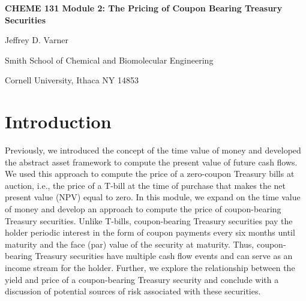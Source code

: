 \documentclass[11pt]{article}
\theoremstyle{definition}
\begin{document}
{\par\centering\textbf{\Large CHEME 131 Module 2: The Pricing of Coupon Bearing Treasury Securities}}
\vspace{0.2in}
{\par \centering \large{Jeffrey D. Varner}}
\vspace{0.05in}
{\par \centering \large{Smith School of Chemical and Biomolecular Engineering}}
{\par \centering \large{Cornell University, Ithaca NY 14853}}

\date{}
\thispagestyle{empty}

\setcounter{page}{1}

\section*{Introduction}
Previously, we introduced the concept of the time value of money and developed the abstract asset framework to compute the present value of future cash flows.
We used this approach to compute the price of a zero-coupon Treasury bills at auction, 
i.e., the price of a T-bill at the time of purchase that makes the net present value (NPV) equal to zero.
In this module, we expand on the time value of money and develop an approach to compute the price of coupon-bearing Treasury securities.
Unlike T-bills, coupon-bearing Treasury securities pay the holder periodic interest in the form of coupon payments every six months until maturity and the face (par) value of the security at maturity.
Thus, coupon-bearing Treasury securities have multiple cash flow events and can serve as an income stream for the holder.
Further, we explore the relationship between the yield and price of a coupon-bearing Treasury security and conclude with a discussion of potential sources of 
risk associated with these securities.
\end{document}
